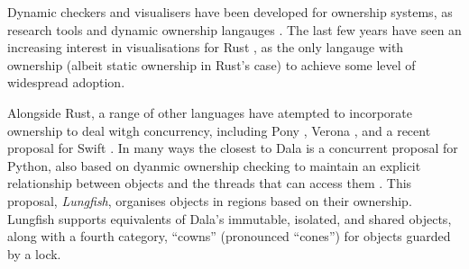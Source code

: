 Dynamic checkers and visualisers have been developed for ownership
systems, as research tools \cite{hill:2002:jvlc,MitchellECOOP2009} and
dynamic ownership langauges \cite{dynamicOwn,dynamicAlias}. The last few
years have seen an 
increasing interest in visualisations for Rust \cite{RustBook}, as the only
langauge with ownership (albeit static ownership in Rust's case) to
achieve some level of widespread adoption.

Alongside Rust, a range of other languages have atempted to
incorporate ownership to deal witgh concurrency, including Pony
\cite{Pony}, Verona \cite{VeronaMemory2023,VeronaConcur2023}, and a
recent proposal for Swift \cite{gallifrey-pldi2022}. In many ways the
closest to Dala is a concurrent proposal for Python, also based on
dyanmic ownership checking to maintain an explicit relationship
between objects and the threads that can access them
\cite{pyrona2025}. This proposal, \textit{Lungfish}, organises objects
in regions based on their ownership. Lungfish supports equivalents of
Dala's immutable, isolated, and shared objects, along with a fourth
category, ``cowns'' (pronounced ``cones'') for objects guarded by a
lock.



